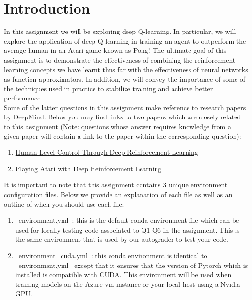\section{Introduction}\label{intro}

In this assignment we will be exploring deep Q-learning. In particular, we will explore the application of deep Q-learning in training an agent to outperform the average human in an Atari game known as Pong! The ultimate goal of this assignment is to demonstrate the effectiveness of combining the reinforcement learning concepts we have learnt thus far with the effectiveness of neural networks as function approximators. In addition, we will convey the importance of some of the techniques used in practice to stabilize training and achieve better performance. \\

Some of the latter questions in this assignment make reference to research papers by \href{https://deepmind.com/}{DeepMind}. Below you may find links to two papers which are closely related to this assignment (Note: questions whose answer requires knowledge from a given paper will contain a link to  the paper within the corresponding question):
\begin{enumerate}
  \item \href{https://storage.googleapis.com/deepmind-media/dqn/DQNNaturePaper.pdf}{Human Level Control Through Deep Reinforcement Learning}
  \item \href{https://arxiv.org/pdf/1312.5602v1.pdf}{Playing Atari with Deep Reinforcement Learning}
\end{enumerate}

  It is important to note that this assignment contains 3 unique environment configuration files. Below we provide an explanation of each file as well as an outline of when you should use each file:

  \begin{enumerate}
    \item ~environment.yml~: this is the default conda environment file which can be used for locally testing code associated to Q1-Q6 in the assignment. This is the same environment that is used by our autograder to test your code.

    \item ~environment_cuda.yml~: this conda environment is identical to ~environment.yml~ except that it ensures that the version of Pytorch which is installed is compatible with CUDA. This environment will be used when training models on the Azure vm instance or your local host using a Nvidia GPU.
  \end{enumerate}



